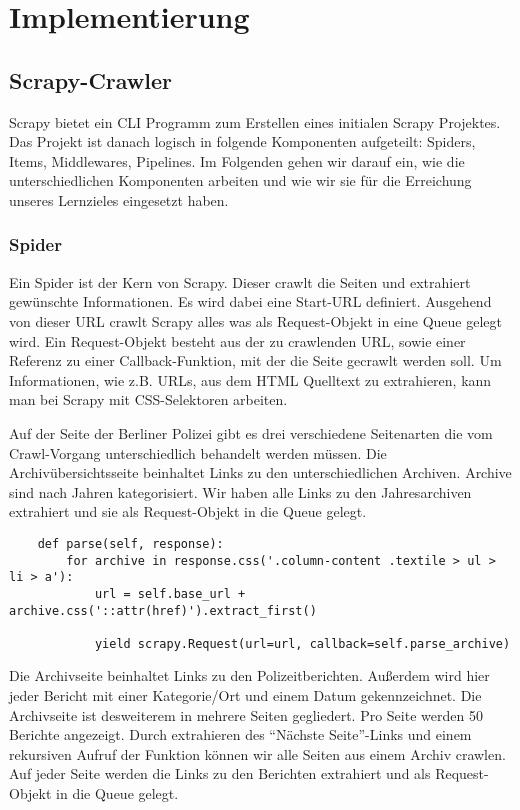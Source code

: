 \chapter{Implementierung}

\section{Scrapy-Crawler}

Scrapy bietet ein CLI Programm zum Erstellen eines initialen Scrapy Projektes.
Das Projekt ist danach logisch in folgende Komponenten aufgeteilt: Spiders, Items, Middlewares, Pipelines.
Im Folgenden gehen wir darauf ein, wie die unterschiedlichen Komponenten arbeiten und wie wir sie für die
Erreichung unseres Lernzieles eingesetzt haben.

\subsection{Spider}

Ein Spider ist der Kern von Scrapy. Dieser crawlt die Seiten und extrahiert gewünschte Informationen.
Es wird dabei eine Start-URL definiert. Ausgehend von dieser URL crawlt Scrapy alles was als Request-Objekt in
eine Queue gelegt wird. Ein Request-Objekt besteht aus der zu crawlenden URL, sowie einer Referenz zu einer Callback-Funktion,
mit der die Seite gecrawlt werden soll. Um Informationen, wie z.B. URLs, aus dem HTML Quelltext zu extrahieren, kann man bei Scrapy
mit CSS-Selektoren arbeiten.

Auf der Seite der Berliner Polizei gibt es drei verschiedene Seitenarten die vom Crawl-Vorgang
unterschiedlich behandelt werden müssen. Die Archivübersichtsseite beinhaltet Links zu den unterschiedlichen Archiven.
Archive sind nach Jahren kategorisiert. Wir haben alle Links zu den Jahresarchiven extrahiert und sie als Request-Objekt in die Queue gelegt.

\begin{verbatim}
    def parse(self, response):
        for archive in response.css('.column-content .textile > ul > li > a'):
            url = self.base_url + archive.css('::attr(href)').extract_first()

            yield scrapy.Request(url=url, callback=self.parse_archive)
    \end{verbatim}

Die Archivseite beinhaltet Links zu den Polizeitberichten. Außerdem wird hier jeder Bericht mit einer Kategorie/Ort
und einem Datum gekennzeichnet. Die Archivseite ist desweiterem in mehrere Seiten gegliedert. Pro Seite werden 50 Berichte angezeigt.
Durch extrahieren des "`Nächste Seite"'-Links und einem rekursiven Aufruf der Funktion können wir alle Seiten aus einem
Archiv crawlen. Auf jeder Seite werden die Links zu den Berichten extrahiert und als Request-Objekt in die Queue gelegt.

